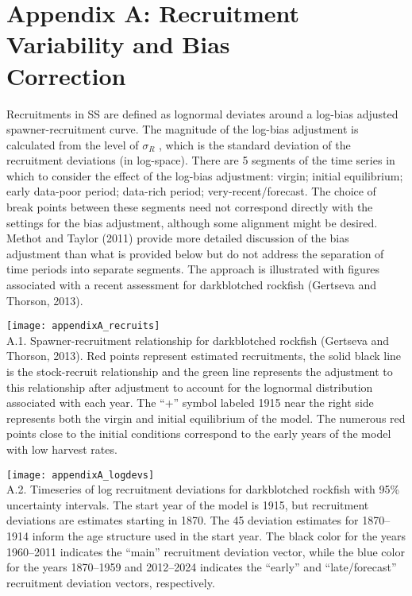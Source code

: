 \section{Appendix A: Recruitment Variability and Bias \\ Correction }


Recruitments in SS are defined as lognormal deviates around a log-bias adjusted spawner-recruitment curve.  The magnitude of the log-bias adjustment is calculated from the level of $\sigma_R$ , which is the standard deviation of the recruitment deviations (in log-space).  There are 5 segments of the time series in which to consider the effect of the log-bias adjustment: virgin; initial equilibrium; early data-poor period; data-rich period; very-recent/forecast. The choice of break points between these segments need not correspond directly with the settings for the bias adjustment, although some alignment might be desired. Methot and Taylor (2011) provide more detailed discussion of the bias adjustment than what is provided below but do not address the separation of time periods into separate segments. The approach is illustrated with figures associated with a recent assessment for darkblotched rockfish (Gertseva and Thorson, 2013).

\texttt{[image: appendixA\_recruits]}\\
\figurename{ A.1. Spawner-recruitment relationship for darkblotched rockfish (Gertseva and Thorson, 2013). Red points represent estimated recruitments, the solid black line is the stock-recruit relationship and the green line represents the adjustment to this relationship after adjustment to account for the lognormal distribution associated with each year. The “+” symbol labeled 1915 near the right side represents both the virgin and initial equilibrium of the model. The numerous red points close to the initial conditions correspond to the early years of the model with low harvest rates.}

\texttt{[image: appendixA\_logdevs]}\\
\figurename{ A.2. Timeseries of log recruitment deviations for darkblotched rockfish with 95\% uncertainty intervals. The start year of the model is 1915, but recruitment deviations are estimates starting in 1870. The 45 deviation estimates for 1870–1914 inform the age structure used in the start year. The black color for the years 1960–2011 indicates the “main” recruitment deviation vector, while the blue color for the years 1870–1959 and 2012–2024 indicates the “early” and “late/forecast” recruitment deviation vectors, respectively. }

